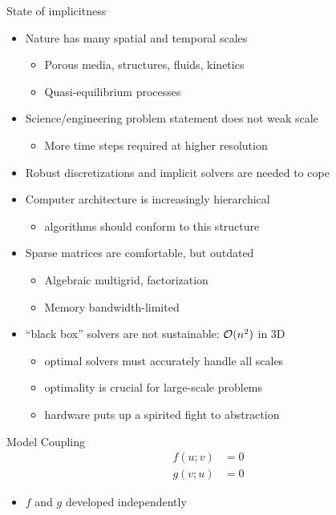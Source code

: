 \documentclass{beamer}
\begin{document}
\begin{frame}{State of implicitness}
  \begin{itemize}
  \item Nature has many spatial and temporal scales
    \begin{itemize}
    \item Porous media, structures, fluids, kinetics
    \item Quasi-equilibrium processes
    \end{itemize}
  \item Science/engineering problem statement does not weak scale
    \begin{itemize}
    \item More time steps required at higher resolution
    \end{itemize}
  \item Robust discretizations and implicit solvers are needed to cope
  \item Computer architecture is increasingly hierarchical
    \begin{itemize}
    \item algorithms should conform to this structure
    \end{itemize}
  \item Sparse matrices are comfortable, but outdated
    \begin{itemize}
    \item Algebraic multigrid, factorization
    \item Memory bandwidth-limited
    \end{itemize}
  \item ``black box'' solvers are not sustainable: $\mathcal{O}(n^2)$ in 3D
    \begin{itemize}
    \item optimal solvers must accurately handle all scales
    \item optimality is crucial for large-scale problems
    \item hardware puts up a spirited fight to abstraction
    \end{itemize}
  \end{itemize}
\end{frame}

\begin{frame}{Model Coupling}
  \begin{align*}
    f(u; v) &= 0 \\
    g(v; u) &= 0
  \end{align*}
  \begin{itemize}
  \item $f$ and $g$ developed independently
  \end{itemize}
\end{frame}




\end{document}
